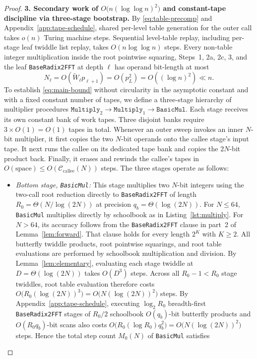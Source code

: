 \begin{proof}
\textbf{3. Secondary work of $O\bigl(n (\log \log n)^2\bigr)$ and constant-tape discipline via three-stage bootstrap.}
By \eqref{eq:table-precomp} and Appendix~\ref{app:tape-schedule}, shared per-level table generation for the outer call takes $o(n)$ Turing machine steps. Sequential level-table replay, including per-stage leaf twiddle list replay, takes $O(n \log \log n)$ steps. Every non-table integer multiplication inside the root pointwise squaring, Steps~1, 2a, 2c, 3, and the leaf \texttt{BaseRadix2FFT} at depth $\ell$ has operand bit-length at most
\[
  N_\ell = O(\tilde{W}_\ell p_{\ell+1}) = O(p_L^2) = O((\log n)^2) \ll n.
\]
To establish \eqref{eq:main-bound} without circularity in the asymptotic constant and with a fixed constant number of tapes, we define a three-stage hierarchy of multiplier procedures $\texttt{Multiply}_2 \to \texttt{Multiply}_1 \to \texttt{BasicMul}$. Each stage receives its own constant bank of work tapes. Three disjoint banks require $3 \times O(1) = O(1)$ tapes in total. Whenever an outer sweep invokes an inner $N$-bit multiplier, it first copies the two $N$-bit operands onto the callee stage's input tape. It next runs the callee on its dedicated tape bank and copies the $2N$-bit product back. Finally, it erases and rewinds the callee's tapes in $O(\text{space}) \le O(\mathcal{C}_{\mathrm{callee}}(N))$ steps. The three stages operate as follows:
\begin{itemize}[leftmargin=*]
  \item \emph{Bottom stage, \texttt{BasicMul}:} This stage multiplies two $N$-bit integers using the two-call root reduction directly to \texttt{BaseRadix2FFT} of length $R_0 = \Theta(N / \log(2N))$ at precision $q_b = \Theta(\log(2N))$. For $N \le 64$, \texttt{BasicMul} multiplies directly by schoolbook as in Listing~\ref{lst:multiply}. For $N > 64$, its accuracy follows from the \texttt{BaseRadix2FFT} clause in part~2 of Lemma~\ref{lem:forward}. That clause holds for every length $2^K$ with $K \ge 2$. All butterfly twiddle products, root pointwise squarings, and root table evaluations are performed by schoolbook multiplication and division. By Lemma~\ref{lem:elementary}, evaluating each stage twiddle at $D = \Theta(\log(2N))$ takes $O(D^3)$ steps. Across all $R_0 - 1 < R_0$ stage twiddles, root table evaluation therefore costs $O\bigl(R_0 (\log(2N))^3\bigr) = O\bigl(N (\log(2N))^2\bigr)$ steps. By Appendix~\ref{app:tape-schedule}, executing $\log_2 R_0$ breadth-first \texttt{BaseRadix2FFT} stages of $R_0 / 2$ schoolbook $O(q_b)$-bit butterfly products and $O(R_0 q_b)$-bit scans also costs $O\bigl(R_0 (\log R_0) q_b^2\bigr) = O\bigl(N (\log(2N))^2\bigr)$ steps. Hence the total step count $M_0(N)$ of \texttt{BasicMul} satisfies

\end{itemize}
\end{proof}
